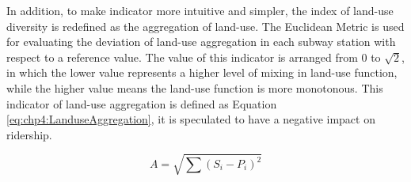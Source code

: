 %		
%		

%
In addition, to make indicator more intuitive and simpler, the index of land-use diversity is redefined as the aggregation of land-use. The Euclidean Metric is used for evaluating the deviation of land-use aggregation in each subway station with respect to a reference value. The value of this indicator is arranged from $0$ to $\sqrt{2}$, in which the lower value represents a higher level of mixing in land-use function, while the higher value means the land-use function is more monotonous. This indicator of land-use aggregation is defined as Equation \ref{eq:chp4:LanduseAggregation}, it is speculated to have a negative impact on ridership.

\begin{equation}
A=\sqrt{\sum (S_i-P_i)^2}
\label{eq:chp4:LanduseAggregation}
\end{equation}

